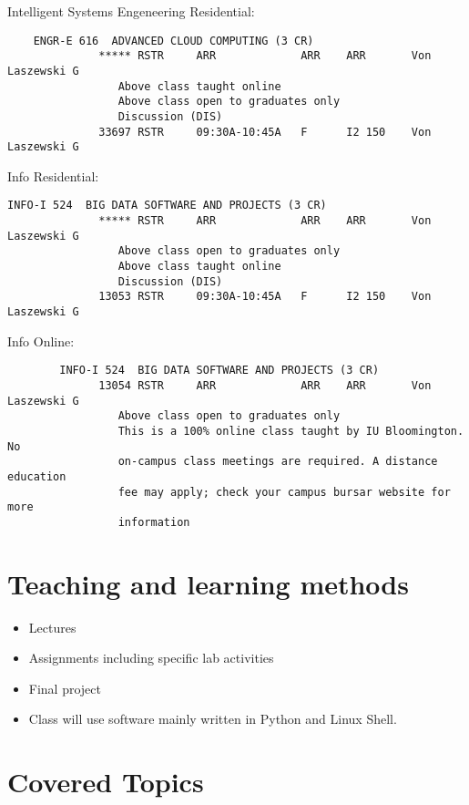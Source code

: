 Intelligent Systems Engeneering Residential:

\begin{verbatim}
	ENGR-E 616  ADVANCED CLOUD COMPUTING (3 CR)
              ***** RSTR     ARR             ARR    ARR       Von Laszewski G
                 Above class taught online
                 Above class open to graduates only
                 Discussion (DIS)
              33697 RSTR     09:30A-10:45A   F      I2 150    Von Laszewski G
\end{verbatim}

Info Residential:

\begin{verbatim}
INFO-I 524  BIG DATA SOFTWARE AND PROJECTS (3 CR) 
              ***** RSTR     ARR             ARR    ARR       Von Laszewski G          
                 Above class open to graduates only
                 Above class taught online
                 Discussion (DIS)
              13053 RSTR     09:30A-10:45A   F      I2 150    Von Laszewski G  
\end{verbatim}

Info Online:

\begin{verbatim}        
        INFO-I 524  BIG DATA SOFTWARE AND PROJECTS (3 CR)
              13054 RSTR     ARR             ARR    ARR       Von Laszewski G          
                 Above class open to graduates only
                 This is a 100% online class taught by IU Bloomington. No
                 on-campus class meetings are required. A distance education
                 fee may apply; check your campus bursar website for more
                 information
\end{verbatim}


\section{Teaching and learning methods}

\begin{itemize}
\item	Lectures
\item	Assignments including specific lab activities
\item	Final project
\item Class will use software mainly written in Python
  and Linux Shell.
\end{itemize}


\section{Covered Topics}

